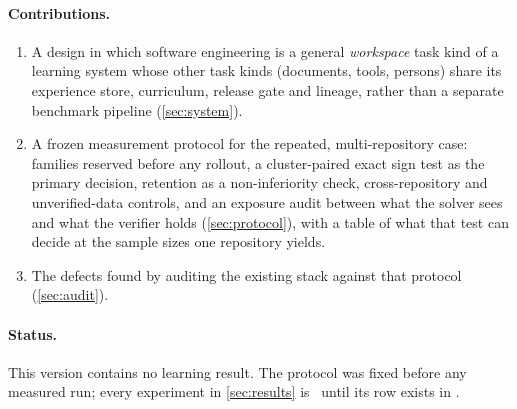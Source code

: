 \paragraph{Contributions.}
\begin{enumerate}
\item A design in which software engineering is a general \emph{workspace} task kind of
a learning system whose other task kinds (documents, tools, persons) share its
experience store, curriculum, release gate and lineage, rather than a separate
benchmark pipeline (\cref{sec:system}).
\item A frozen measurement protocol for the repeated, multi-repository case: families
reserved before any rollout, a cluster-paired exact sign test as the primary decision,
retention as a non-inferiority check, cross-repository and unverified-data controls, and an exposure
audit between what the solver sees and what the verifier holds (\cref{sec:protocol}),
with a table of what that test can decide at the sample sizes one repository yields.
\item The defects found by auditing the existing stack against that protocol
(\cref{sec:audit}).
\end{enumerate}

\paragraph{Status.} This version contains no learning result. The protocol was fixed
before any measured run; every experiment in \cref{sec:results} is \notrun\ until its row
exists in .
